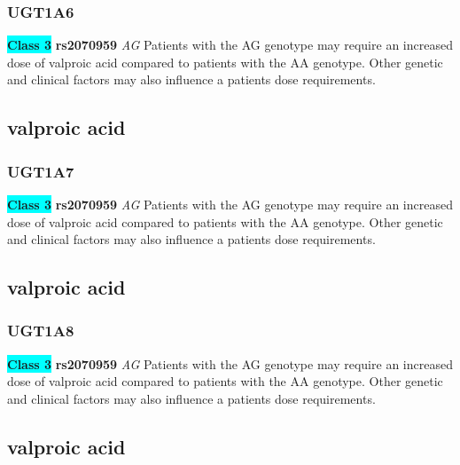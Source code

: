 \documentclass{book}
\begin{document}
\subsubsection{ UGT1A6 }

\begin{center}
\textbf{\colorbox{cyan} {Class 3}} \textbf{ rs2070959 } \textit{ AG }
Patients with the AG genotype may require an increased dose of valproic acid compared to patients with the AA genotype. Other genetic and clinical factors may also influence a patients dose requirements.


\end{center}\subsection{ valproic acid }


\subsubsection{ UGT1A7 }

\begin{center}
\textbf{\colorbox{cyan} {Class 3}} \textbf{ rs2070959 } \textit{ AG }
Patients with the AG genotype may require an increased dose of valproic acid compared to patients with the AA genotype. Other genetic and clinical factors may also influence a patients dose requirements.


\end{center}\subsection{ valproic acid }


\subsubsection{ UGT1A8 }

\begin{center}
\textbf{\colorbox{cyan} {Class 3}} \textbf{ rs2070959 } \textit{ AG }
Patients with the AG genotype may require an increased dose of valproic acid compared to patients with the AA genotype. Other genetic and clinical factors may also influence a patients dose requirements.


\end{center}\subsection{ valproic acid }
\end{document}
